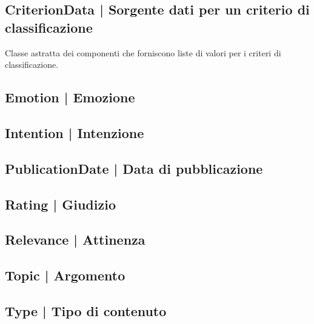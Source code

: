 \documentclass[10pt,a4paper,headinclude,footinclude,hidelinks]{scrreprt} %
\begin{document}
	\subsection[CriterionData]{CriterionData | Sorgente dati per un criterio di classificazione}
	\label{sec:stage:design:sistema:model.criteria:criterion-data}
	Classe astratta dei componenti che forniscono liste di valori per i criteri di classificazione.

	\subsection[Emotion]{Emotion | Emozione}
	\label{sec:stage:design:sistema:model.criteria:emotion}

	\subsection[Intention]{Intention | Intenzione}
	\label{sec:stage:design:sistema:model.criteria:intention}

	\subsection[PublicationDate]{PublicationDate | Data di pubblicazione}
	\label{sec:stage:design:sistema:model.criteria:publication-date}

	\subsection[Rating]{Rating | Giudizio}
	\label{sec:stage:design:sistema:model.criteria:rating}

	\subsection[Relevance]{Relevance | Attinenza}
	\label{sec:stage:design:sistema:model.criteria:relevance}

	\subsection[Topic]{Topic | Argomento}
	\label{sec:stage:design:sistema:model.criteria:topic}

	\subsection[Type]{Type | Tipo di contenuto}
	\label{sec:stage:design:sistema:model.criteria:type}
\end{document}

